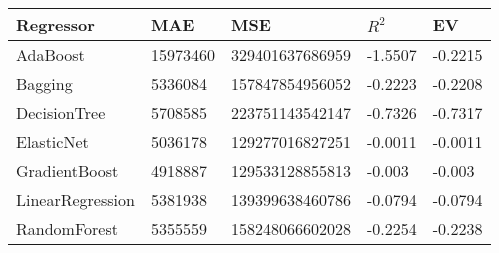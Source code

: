 \begin{tabular}{|p{3cm}p{1.5cm}p{2.5cm}p{1.2cm}p{1.2cm}|}
  \hline
Regressor & MAE & MSE & $R^2$ & EV \\ 
  \hline \hline
AdaBoost & 15973460 & 329401637686959 & -1.5507 & -0.2215 \\ 
  Bagging & 5336084 & 157847854956052 & -0.2223 & -0.2208 \\ 
  DecisionTree & 5708585 & 223751143542147 & -0.7326 & -0.7317 \\ 
  ElasticNet & 5036178 & 129277016827251 & -0.0011 & -0.0011 \\ 
  GradientBoost & 4918887 & 129533128855813 & -0.003 & -0.003 \\ 
  LinearRegression & 5381938 & 139399638460786 & -0.0794 & -0.0794 \\ 
  RandomForest & 5355559 & 158248066602028 & -0.2254 & -0.2238 \\ 
   \hline
\end{tabular}
